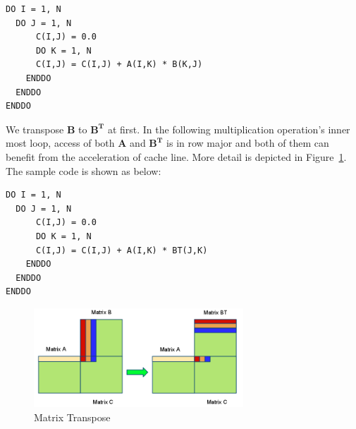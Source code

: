 \documentclass[12pt]{article}
\begin{document}
\begin{verbatim}
DO I = 1, N 
  DO J = 1, N
	  C(I,J) = 0.0 
      DO K = 1, N
      C(I,J) = C(I,J) + A(I,K) * B(K,J) 
    ENDDO
  ENDDO
ENDDO
\end{verbatim}

We transpose $\mathbf{B}$ to $\mathbf{B^{T}}$ at first. In the 
following multiplication operation's inner most loop, access of 
both $\mathbf{A}$ and $\mathbf{B^{T}}$ is in row major and both
of them can benefit from the acceleration of cache line. More 
detail is depicted in Figure~\ref{fig:cacheline}. The sample code 
is shown as below:

\begin{verbatim}
DO I = 1, N 
  DO J = 1, N
	  C(I,J) = 0.0 
      DO K = 1, N
      C(I,J) = C(I,J) + A(I,K) * BT(J,K) 
    ENDDO
  ENDDO
ENDDO
\end{verbatim}

\begin{figure}[h!]
	\begin{center}
		\includegraphics[width=0.7\textwidth]{cacheline.png}
		\caption{\label{fig:cacheline}Matrix Transpose}
	\end{center}
\end{figure}
\end{document}
